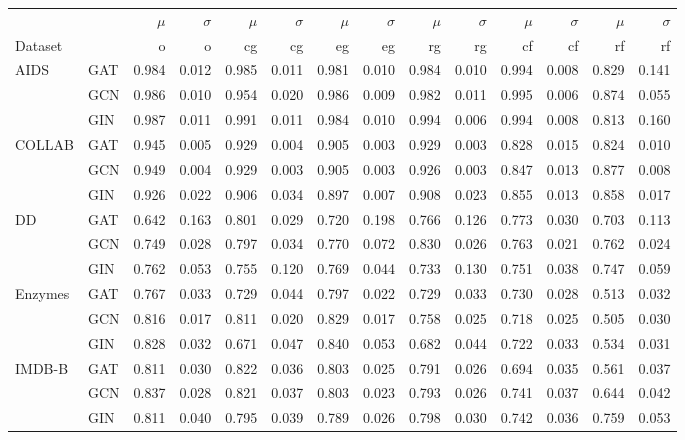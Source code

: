\begin{tabular}{llrrrrrrrrrrrr}
\toprule
 &  & $\mu$ & $\sigma$ & $\mu$ & $\sigma$ & $\mu$ & $\sigma$ & $\mu$ & $\sigma$ & $\mu$ & $\sigma$ & $\mu$ & $\sigma$ \\
 Dataset&  & o & o & cg & cg & eg & eg & rg & rg & cf & cf & rf & rf \\
\midrule
\multirow[t]{3}{*}{AIDS} & GAT & 0.984 & 0.012 & 0.985 & 0.011 & 0.981 & 0.010 & 0.984 & 0.010 & 0.994 & 0.008 & 0.829 & 0.141 \\
 & GCN & 0.986 & 0.010 & 0.954 & 0.020 & 0.986 & 0.009 & 0.982 & 0.011 & 0.995 & 0.006 & 0.874 & 0.055 \\
 & GIN & 0.987 & 0.011 & 0.991 & 0.011 & 0.984 & 0.010 & 0.994 & 0.006 & 0.994 & 0.008 & 0.813 & 0.160 \\
\cline{1-14}
\multirow[t]{3}{*}{COLLAB} & GAT & 0.945 & 0.005 & 0.929 & 0.004 & 0.905 & 0.003 & 0.929 & 0.003 & 0.828 & 0.015 & 0.824 & 0.010 \\
 & GCN & 0.949 & 0.004 & 0.929 & 0.003 & 0.905 & 0.003 & 0.926 & 0.003 & 0.847 & 0.013 & 0.877 & 0.008 \\
 & GIN & 0.926 & 0.022 & 0.906 & 0.034 & 0.897 & 0.007 & 0.908 & 0.023 & 0.855 & 0.013 & 0.858 & 0.017 \\
\cline{1-14}
\multirow[t]{3}{*}{DD} & GAT & 0.642 & 0.163 & 0.801 & 0.029 & 0.720 & 0.198 & 0.766 & 0.126 & 0.773 & 0.030 & 0.703 & 0.113 \\
 & GCN & 0.749 & 0.028 & 0.797 & 0.034 & 0.770 & 0.072 & 0.830 & 0.026 & 0.763 & 0.021 & 0.762 & 0.024 \\
 & GIN & 0.762 & 0.053 & 0.755 & 0.120 & 0.769 & 0.044 & 0.733 & 0.130 & 0.751 & 0.038 & 0.747 & 0.059 \\
\cline{1-14}
\multirow[t]{3}{*}{Enzymes} & GAT & 0.767 & 0.033 & 0.729 & 0.044 & 0.797 & 0.022 & 0.729 & 0.033 & 0.730 & 0.028 & 0.513 & 0.032 \\
 & GCN & 0.816 & 0.017 & 0.811 & 0.020 & 0.829 & 0.017 & 0.758 & 0.025 & 0.718 & 0.025 & 0.505 & 0.030 \\
 & GIN & 0.828 & 0.032 & 0.671 & 0.047 & 0.840 & 0.053 & 0.682 & 0.044 & 0.722 & 0.033 & 0.534 & 0.031 \\
\cline{1-14}
\multirow[t]{3}{*}{IMDB-B} & GAT & 0.811 & 0.030 & 0.822 & 0.036 & 0.803 & 0.025 & 0.791 & 0.026 & 0.694 & 0.035 & 0.561 & 0.037 \\
 & GCN & 0.837 & 0.028 & 0.821 & 0.037 & 0.803 & 0.023 & 0.793 & 0.026 & 0.741 & 0.037 & 0.644 & 0.042 \\
 & GIN & 0.811 & 0.040 & 0.795 & 0.039 & 0.789 & 0.026 & 0.798 & 0.030 & 0.742 & 0.036 & 0.759 & 0.053 \\

\end{tabular}
